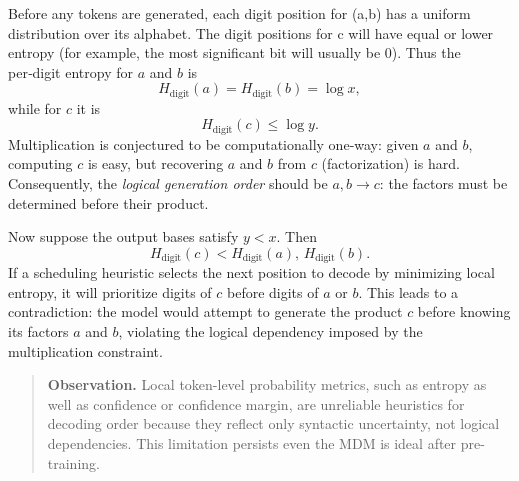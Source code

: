 Before any tokens are generated, each digit position for (a,b) has a uniform distribution over its alphabet.  The digit positions for c will have equal or lower entropy (for example, the most significant bit will usually be 0). Thus the per‑digit entropy for \(a\) and \(b\) is
\begin{equation}
H_{\text{digit}}(a)=H_{\text{digit}}(b)=\log x,
\end{equation}
while for \(c\) it is
\begin{equation}
H_{\text{digit}}(c)\le\log y .
\end{equation}
Multiplication is conjectured to be computationally one‑way: given \(a\) and \(b\), computing \(c\) is easy, but recovering \(a\) and \(b\) from \(c\) (factorization) is hard. Consequently, the \emph{logical generation order} should be \(a,b \to c\): the factors must be determined before their product.

Now suppose the output bases satisfy \(y < x\). Then
\begin{equation}
H_{\text{digit}}(c) < H_{\text{digit}}(a),\, H_{\text{digit}}(b).
\end{equation}
If a scheduling heuristic selects the next position to decode by minimizing local entropy, it will prioritize digits of \(c\) before digits of \(a\) or \(b\). This leads to a contradiction: the model would attempt to generate the product \(c\) before knowing its factors \(a\) and \(b\), violating the logical dependency imposed by the multiplication constraint.
\begin{quote}
\textbf{Observation.} 
Local token-level probability metrics, such as entropy as well as confidence or confidence margin, are unreliable heuristics for decoding order because they reflect only syntactic uncertainty, not logical dependencies. 
This limitation persists even the MDM is ideal after pre-training.
\end{quote}




